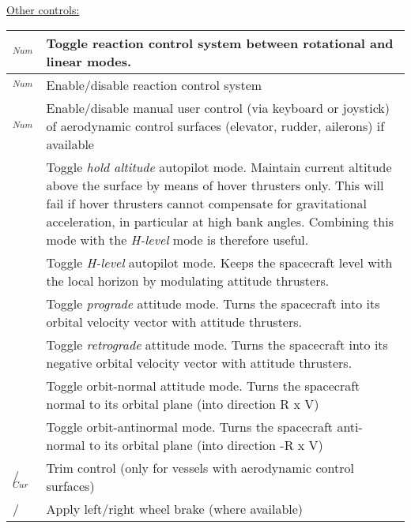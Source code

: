 \documentclass[Orbiter User Manual.tex]{subfiles}
\begin{document}

\leavevmode\\
\noindent
\underline{Other controls:}

	\begin{longtable}{ |p{}|p{}| }
	\hline\rule{0pt}{2ex}
	\keystroke{/}$_{Num}$ & Toggle reaction control system between rotational and linear modes.\\
	\hline\rule{0pt}{2ex}
	\Ctrl\keystroke{/}$_{Num}$ & Enable/disable reaction control system\\
	\hline\rule{0pt}{2ex}
	\Alt\keystroke{/}$_{Num}$ & Enable/disable manual user control (via keyboard or joystick) of aerodynamic control surfaces (elevator, rudder, ailerons) if available\\
	\hline\rule{0pt}{2ex}
	\keystroke{A} & Toggle \textit{hold altitude} autopilot mode. Maintain current altitude above the surface by means of hover thrusters only. This will fail if hover thrusters cannot compensate for gravitational acceleration, in particular at high bank angles. Combining this mode with the \textit{H-level} mode is therefore useful.\\
	\hline\rule{0pt}{2ex}
	\keystroke{L} & Toggle \textit{H-level} autopilot mode. Keeps the spacecraft level with the local horizon by modulating attitude thrusters.\\
	\hline\rule{0pt}{2ex}
	\keystroke{[} & Toggle \textit{prograde} attitude mode. Turns the spacecraft into its orbital velocity vector with attitude thrusters.\\
	\hline\rule{0pt}{2ex}
	\keystroke{]} & Toggle \textit{retrograde} attitude mode. Turns the spacecraft into its negative orbital velocity vector with attitude thrusters.\\
	\hline\rule{0pt}{2ex}
	\keystroke{;} & Toggle orbit-normal attitude mode. Turns the spacecraft normal to its orbital plane (into direction R x V)\\
	\hline\rule{0pt}{2ex}
	\keystroke{'} & Toggle orbit-antinormal mode. Turns the spacecraft anti-normal to its orbital plane (into direction -R x V)\\
	\hline\rule{0pt}{2ex}
	\keystroke{Ins}/\keystroke{Del}$_{Cur}$ & Trim control (only for vessels with aerodynamic control surfaces)\\
	\hline\rule{0pt}{2ex}
	\keystroke{,}/\keystroke{.} & Apply left/right wheel brake (where available)\\
	\hline
	\end{longtable}
\end{document}
